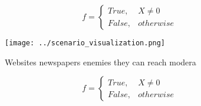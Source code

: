\documentclass[a4paper]{article}
\begin{document}
\begin{equation}   f =
\begin{cases} True, & X \neq 0\\
False, & otherwise
\end{cases}
\end{equation}

\begin{figure}
\centering
\texttt{[image: ../scenario\_visualization.png]}
\caption{Websites newspapers enemies they can reach modera
}
\end{figure}
 
\begin{equation}   f =
\begin{cases} True, & X \neq 0\\
False, & otherwise
\end{cases}
\end{equation}
\end{document}
